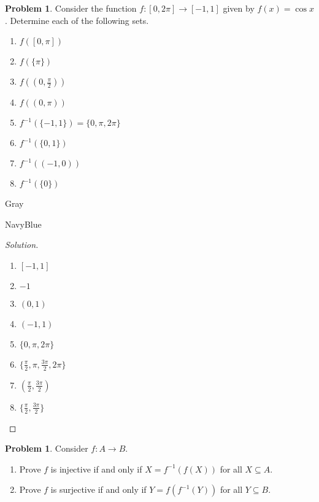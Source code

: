 \documentclass[12pt]{amsart}
\newcounter{problem_number}[section]
\theoremstyle{named}
\newenvironment{soln}
{\begin{color}{Gray}\begin{framed}\begin{color}{NavyBlue}\begin{proof}[Solution]
\doublespacing}
{\end{proof}\end{color}\end{framed}\end{color}}
\theoremstyle{definition}
\newtheorem{problem}[proposition]{Problem}
\begin{document}
\begin{problem}
	Consider the function $f\colon [0,2\pi]\to [-1,1]$ given by $f(x) = \cos x$. Determine each of the following sets.
	\begin{enumerate}
		\item $f\left([0,\pi]\right)$
		\item $f\left(\{\pi\}\right)$
		\item $f\left((0,\frac{\pi}{2})\right)$
		\item $f\left((0,\pi)\right)$
		\item $f^{-1}\left(\{-1,1\}\right) = \{0,\pi,2\pi\}$
		\item $f^{-1}\left(\{0,1\}\right)$
		\item $f^{-1}\left((-1,0)\right)$
		\item $f^{-1}\left(\{0\}\right)$
	\end{enumerate}
\end{problem}

\begin{soln}
    \phantom{ }

    \begin{enumerate}
        \item $[-1,1]$
        \item $-1$
        \item $(0,1)$
        \item $(-1,1)$
        \item $\{0,\pi,2\pi\}$
        \item $\{\frac{\pi}{2},\pi,\frac{3\pi}{2},2\pi\}$
        \item $(\frac{\pi}{2},\frac{3\pi}{2})$
        \item $\{\frac{\pi}{2},\frac{3\pi}{2}\}$
    \end{enumerate}
\end{soln}

\vspace{20em}

\begin{problem}
	Consider $f\colon A\to B$.
	\begin{enumerate}
		\item Prove $f$ is injective if and only if $X = f^{-1}(f(X))$ for all $X\subseteq A$.
		\item Prove $f$ is surjective if and only if $Y=f(f^{-1}(Y))$ for all $Y\subseteq B$.
	\end{enumerate}
\end{problem}
\end{document}
